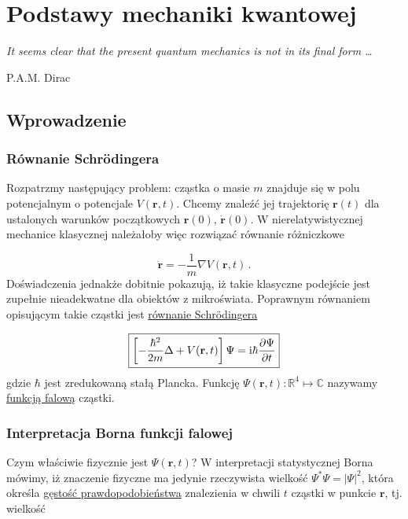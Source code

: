\documentclass{myclass}
\author{Bartosz Hanc}
\begin{document}
\onecolumn
\tableofcontents

\newpage

\restoregeometry

\section*{Podstawy mechaniki kwantowej}

\textit{It seems clear that the present quantum mechanics is not in its final form
\ldots}\begin{flushright}P.A.M. Dirac\end{flushright}

\subsection{Wprowadzenie}

\subsubsection{Równanie Schr{\"o}dingera}

Rozpatrzmy następujący problem: cząstka o masie \(m\) znajduje się w polu potencjalnym o potencjale
\(V(\mathbf{r},t)\). Chcemy znaleźć jej trajektorię \(\mathbf{r}(t)\) dla ustalonych warunków
początkowych \(\mathbf{r}(0)\), \(\dot{\mathbf{r}}(0)\). W nierelatywistycznej mechanice klasycznej
należałoby więc rozwiązać równanie różniczkowe

\begin{equation*}
    \ddot{\mathbf{r}}=-\frac{1}{m}\nabla V(\mathbf{r},t)\,.
\end{equation*}
Doświadczenia jednakże dobitnie pokazują, iż takie klasyczne podejście jest zupełnie nieadekwatne
dla obiektów z mikroświata. Poprawnym równaniem opisującym takie cząstki jest \underline{równanie
Schr{\"o}dingera}

\begin{equation*}
    \boxed{\left[-\frac{\hbar^2}{2m}\Delta+V(\mathbf{r},t)\right]\Psi=\mathrm{i}\hbar\pdv{\Psi}{t}}
\end{equation*}
gdzie \(\hbar\) jest zredukowaną stałą Plancka. Funkcję
\(\Psi(\mathbf{r},t):\mathbb{R}^4\mapsto\mathbb{C}\) nazywamy \underline{funkcją falową} cząstki.
\subsubsection{Interpretacja Borna funkcji falowej}
Czym właściwie fizycznie jest \(\Psi(\mathbf{r},t)\)? W interpretacji statystycznej Borna mówimy, iż
znaczenie fizyczne ma jedynie rzeczywista wielkość \(\Psi^*\Psi=|\Psi|^2\), która określa
\underline{gęstość prawdopodobieństwa} znalezienia w chwili \(t\) cząstki w punkcie \(\mathbf{r}\),
tj. wielkość
\end{document}
